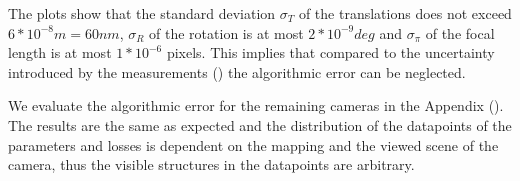 The plots show that the standard deviation $\sigma_T$ of the translations does not exceed $6 * 10^{-8} m = 60 nm$, $\sigma_R$ of the rotation is at most $2 * 10^{-9} deg$ and $\sigma_{\pi}$ of the focal length is at most $1 * 10^{-6}$ pixels.
This implies that compared to the uncertainty introduced by the measurements () the algorithmic error can be neglected.   

We evaluate the algorithmic error for the remaining cameras in the Appendix (). 
The results are the same as expected and the distribution of the datapoints of the parameters and losses is dependent on the mapping and the viewed scene of the camera, thus the visible structures in the datapoints are arbitrary. 
